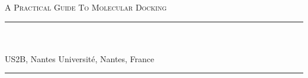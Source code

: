 
\begin{titlepage}
    \colorbox{black!5}{
        \parbox[t]{0.975\textwidth}{%
            \parbox[t]{0.95\textwidth}{%
                \raggedleft\vspace{0.75cm}\Huge\scshape
                A Practical Guide To Molecular Docking \\[7.5pt]
                \large\bf
                \vspace{0.75cm}
            }
        }}

    \vfill

    \parbox[t]{0.95\textwidth}{%
        \hfill\rule{0.15\linewidth}{0.5pt}\\[7.5pt]
        \raggedleft
        \textcopyright{}\\[4pt]
        US2B, Nantes Université, Nantes, France\\

        \hfill\rule{0.15\linewidth}{0.5pt}
}
\end{titlepage}
